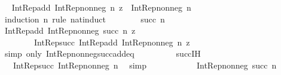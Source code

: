 \begin{isabellebody}
\ \isamarkupfalse%
\ {\isachardoublequoteopen}Int{\isacharunderscore}{\kern0pt}Rep{\isacharunderscore}{\kern0pt}add\ {\isacharparenleft}{\kern0pt}Int{\isacharunderscore}{\kern0pt}Rep{\isacharunderscore}{\kern0pt}nonneg\ n{\isacharparenright}{\kern0pt}\ {\isacharquery}{\kern0pt}z\ {\isacharequal}{\kern0pt}\ Int{\isacharunderscore}{\kern0pt}Rep{\isacharunderscore}{\kern0pt}nonneg\ n{\isachardoublequoteclose}\isanewline
\ \ \ \ \isamarkupfalse%
\ {\isacharparenleft}{\kern0pt}induction\ n\ rule{\isacharcolon}{\kern0pt}\ nat{\isacharunderscore}{\kern0pt}induct{\isacharparenright}{\kern0pt}\isanewline
\ \ \ \ \ \ \isamarkupfalse%
\ {\isacharparenleft}{\kern0pt}succ\ n{\isacharparenright}{\kern0pt}\isanewline
\ \ \ \ \ \ \isamarkupfalse%
\ {\isachardoublequoteopen}Int{\isacharunderscore}{\kern0pt}Rep{\isacharunderscore}{\kern0pt}add\ {\isacharparenleft}{\kern0pt}Int{\isacharunderscore}{\kern0pt}Rep{\isacharunderscore}{\kern0pt}nonneg\ {\isacharparenleft}{\kern0pt}succ\ n{\isacharparenright}{\kern0pt}{\isacharparenright}{\kern0pt}\ {\isacharquery}{\kern0pt}z\ {\isacharequal}{\kern0pt}\isanewline
\ \ \ \ \ \ \ \ Int{\isacharunderscore}{\kern0pt}Rep{\isacharunderscore}{\kern0pt}succ\ {\isacharparenleft}{\kern0pt}Int{\isacharunderscore}{\kern0pt}Rep{\isacharunderscore}{\kern0pt}add\ {\isacharparenleft}{\kern0pt}Int{\isacharunderscore}{\kern0pt}Rep{\isacharunderscore}{\kern0pt}nonneg\ n{\isacharparenright}{\kern0pt}\ {\isacharquery}{\kern0pt}z{\isacharparenright}{\kern0pt}{\isachardoublequoteclose}\isanewline
\ \ \ \ \ \ \ \ \isamarkupfalse%
\ {\isacharparenleft}{\kern0pt}simp\ only{\isacharcolon}{\kern0pt}\ Int{\isacharunderscore}{\kern0pt}Rep{\isacharunderscore}{\kern0pt}nonneg{\isacharunderscore}{\kern0pt}succ{\isacharunderscore}{\kern0pt}add{\isacharunderscore}{\kern0pt}eq{\isacharparenright}{\kern0pt}\isanewline
\ \ \ \ \ \ \isamarkupfalse%
\ \isamarkupfalse%
\ succ{\isachardot}{\kern0pt}IH\ \isamarkupfalse%
\ {\isachardoublequoteopen}{\isachardot}{\kern0pt}{\isachardot}{\kern0pt}{\isachardot}{\kern0pt}\ {\isacharequal}{\kern0pt}\ Int{\isacharunderscore}{\kern0pt}Rep{\isacharunderscore}{\kern0pt}succ\ {\isacharparenleft}{\kern0pt}Int{\isacharunderscore}{\kern0pt}Rep{\isacharunderscore}{\kern0pt}nonneg\ n{\isacharparenright}{\kern0pt}{\isachardoublequoteclose}\ \isamarkupfalse%
\ simp\isanewline
\ \ \ \ \ \ \isamarkupfalse%
\ \isamarkupfalse%
\ {\isachardoublequoteopen}{\isachardot}{\kern0pt}{\isachardot}{\kern0pt}{\isachardot}{\kern0pt}\ {\isacharequal}{\kern0pt}\ Int{\isacharunderscore}{\kern0pt}Rep{\isacharunderscore}{\kern0pt}nonneg\ {\isacharparenleft}{\kern0pt}succ\ n{\isacharparenright}{\kern0pt}{\isachardoublequoteclose}\ \isamarkupfalse%

\end{isabellebody}
